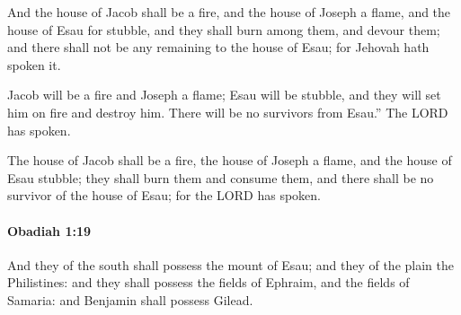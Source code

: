 			\begin{versebox}
					\item[BHS] 
					\item[LXX] 
					\item[ASV] And the house of Jacob shall be a fire, and the house of Joseph a flame, and the house of Esau for stubble, and they shall burn among them, and devour them; and there shall not be any remaining to the house of Esau; for Jehovah hath spoken it.
					\item[NIV] Jacob will be a fire and Joseph a flame; Esau will be stubble, and they will set him on fire and destroy him. There will be no survivors from Esau.” The LORD has spoken.
					\item[NRSV] The house of Jacob shall be a fire, the house of Joseph a flame, and the house of Esau stubble; they shall burn them and consume them, and there shall be no survivor of the house of Esau; for the LORD has spoken.
			\end{versebox}

		\paragraph{Obadiah 1:19} %
			\label{OBADIAH-1-19}

			And they of the south shall possess the mount of Esau; and they of the plain the Philistines: and they shall possess the fields of Ephraim, and the fields of Samaria: and Benjamin shall possess Gilead.

